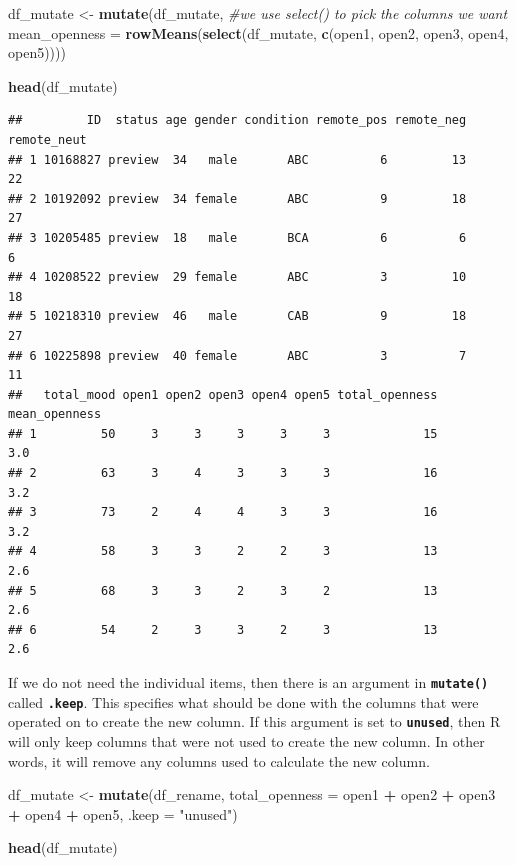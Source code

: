 \documentclass[
]{book}
\newenvironment{Shaded}{\begin{snugshade}}{\end{snugshade}}
\newcommand{\AttributeTok}[1]{\textcolor[rgb]{0.13,0.29,0.53}{#1}}
\newcommand{\CommentTok}[1]{\textcolor[rgb]{0.56,0.35,0.01}{\textit{#1}}}
\newcommand{\FunctionTok}[1]{\textcolor[rgb]{0.13,0.29,0.53}{\textbf{#1}}}
\newcommand{\NormalTok}[1]{#1}
\newcommand{\OtherTok}[1]{\textcolor[rgb]{0.56,0.35,0.01}{#1}}
\newcommand{\SpecialCharTok}[1]{\textcolor[rgb]{0.81,0.36,0.00}{\textbf{#1}}}
\newcommand{\StringTok}[1]{\textcolor[rgb]{0.31,0.60,0.02}{#1}}
\begin{document}
\begin{Shaded}
\begin{Highlighting}[]
\NormalTok{df\_mutate }\OtherTok{\textless{}{-}} \FunctionTok{mutate}\NormalTok{(df\_mutate, }
                    \CommentTok{\#we use \textasciigrave{}select()\textasciigrave{} to pick the columns we want}
                    \AttributeTok{mean\_openness =} \FunctionTok{rowMeans}\NormalTok{(}\FunctionTok{select}\NormalTok{(df\_mutate, }
                                                    \FunctionTok{c}\NormalTok{(open1, open2, open3,}
\NormalTok{                                                      open4, open5))))}
                    

\FunctionTok{head}\NormalTok{(df\_mutate)}
\end{Highlighting}
\end{Shaded}

\begin{verbatim}
##         ID  status age gender condition remote_pos remote_neg remote_neut
## 1 10168827 preview  34   male       ABC          6         13          22
## 2 10192092 preview  34 female       ABC          9         18          27
## 3 10205485 preview  18   male       BCA          6          6           6
## 4 10208522 preview  29 female       ABC          3         10          18
## 5 10218310 preview  46   male       CAB          9         18          27
## 6 10225898 preview  40 female       ABC          3          7          11
##   total_mood open1 open2 open3 open4 open5 total_openness mean_openness
## 1         50     3     3     3     3     3             15           3.0
## 2         63     3     4     3     3     3             16           3.2
## 3         73     2     4     4     3     3             16           3.2
## 4         58     3     3     2     2     3             13           2.6
## 5         68     3     3     2     3     2             13           2.6
## 6         54     2     3     3     2     3             13           2.6
\end{verbatim}

If we do not need the individual items, then there is an argument in \textbf{\texttt{mutate()}} called \textbf{\texttt{.keep}}. This specifies what should be done with the columns that were operated on to create the new column. If this argument is set to \textbf{\texttt{unused}}, then R will only keep columns that were not used to create the new column. In other words, it will remove any columns used to calculate the new column.

\begin{Shaded}
\begin{Highlighting}[]
\NormalTok{df\_mutate }\OtherTok{\textless{}{-}} \FunctionTok{mutate}\NormalTok{(df\_rename, }
                    \AttributeTok{total\_openness =}\NormalTok{ open1 }\SpecialCharTok{+}\NormalTok{ open2 }\SpecialCharTok{+}\NormalTok{ open3 }\SpecialCharTok{+}\NormalTok{ open4 }\SpecialCharTok{+}\NormalTok{ open5,}
                    \AttributeTok{.keep =} \StringTok{"unused"}\NormalTok{)}

\FunctionTok{head}\NormalTok{(df\_mutate)}
\end{Highlighting}
\end{Shaded}
\end{document}
